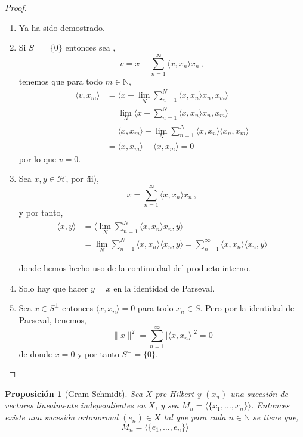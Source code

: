 \documentclass[12pt]{book}
\newtheorem{prop}{\bf Proposición}[chapter]
\def\NN{\mathbb{N}}
\newcommand{\abs}[1]{\lvert #1\rvert }
\newcommand{\norm}[1]{\lVert #1\rVert }
\newcommand{\lin}[1]{\langle #1 \rangle}
\newcommand{\Lin}[1]{\langle #1 \rangle}
\begin{document}
\begin{proof}
\quad\par

\begin{enumerate}
\item[\framebox{i$\Leftrightarrow$ii}] Ya ha sido demostrado.
\item[\framebox{i$\Rightarrow$iii}] Si $S^\perp=\{0\}$ entonces sea ,
$$v=x-\sum_{n=1}^\infty \lin{x,x_n}x_n\,,$$
tenemos que para todo $m\in \NN$,
\begin{align*}
\lin{v,x_m}&=\Lin{x-\lim_N\sum_{n=1}^N \lin{x,x_n} x_n,x_m}\\
&=\lim_N\Lin{x-\sum_{n=1}^N \lin{x,x_n}x_n,x_m}\\
&=\lin{x,x_m}-\lim_N\sum_{n=1}^N\lin{x,x_n}\lin{x_n,x_m}\\
&=\lin{x,x_m}-\lin{x,x_m}=0
\end{align*}
por lo que $v=0$.
\item[\framebox{iii$\Rightarrow$iv}] Sea $x,y\in \mathcal{H}$, por {\emph iii)},
$$x=\sum_{n=1}^\infty \lin{x,x_n}x_n\,,$$
y por tanto,
\begin{align*}
\lin{x,y}&=\Lin{\lim_N\sum_{n=1}^N \lin{x,x_n}x_n,y}\\
&=\lim_N\sum_{n=1}^N \lin{x,x_n}\lin{x_n, y}=\sum_{n=1}^\infty\lin{x,x_n}\lin{x_n,y}
\end{align*}

donde hemos hecho uso de la continuidad del producto interno.
\item[\framebox{iv$\Rightarrow$ v}] Solo hay que hacer $y=x$ en la identidad de Parseval.

\item[\framebox{v$\Rightarrow$i}] Sea $x\in S^\perp$ entonces $\lin{x, x_n}=0$ para todo $x_n\in S$. Pero por la identidad de Parseval, tenemos,
$$\norm{x}^2=\sum_{n=1}^\infty \abs{\lin{x,x_n}}^2=0$$
de donde $x=0$ y por tanto  $S^\perp=\{0\}$.

\end{enumerate}
\end{proof}
\begin{prop}[Gram-Schmidt] Sea $X$ pre-Hilbert y  $(x_n)$ una sucesión de vectores linealmente independientes  en $X$, y sea $M_n=\lin{\{x_1,\dots,x_n\}}$. Entonces existe una sucesión  ortonormal $(e_n)\in X$ tal que   para cada $n\in \NN$ se tiene que,
$$M_n=\lin{\{e_1,\dots,e_n\}}$$
\end{prop}
\end{document}
